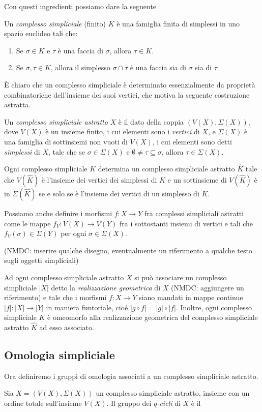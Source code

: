 Con questi ingredienti possiamo dare la seguente
\begin{defn}
Un \emph{complesso simpliciale} (finito) $K$ è una famiglia finita di simplessi in uno spazio euclideo tali che:
\begin{enumerate}
  \item Se $\sigma\in K$ e $\tau$ è una faccia di $\sigma$, allora $\tau \in K$.
  \item Se $\sigma,\tau\in K$, allora il simplesso $\sigma\cap\tau$ è una faccia sia di $\sigma$ sia di $\tau$.
\end{enumerate}
\end{defn}

\`E chiaro che un complesso simpliciale è determinato essenzialmente da proprietà combinatoriche dell'insieme dei suoi vertici, che motiva la seguente costruzione astratta.

\begin{defn}
  Un \emph{complesso simpliciale astratto} $X$ è il dato della coppia $(V(X), \Sigma(X))$, dove $V(X)$ è un insieme finito, i cui elementi sono i \emph{vertici} di $X$, e $\Sigma(X)$ è una famiglia di sottinsiemi non vuoti di $V(X)$, i cui elementi sono detti \emph{simplessi} di $X$, tale che se $\sigma \in \Sigma(X)$ e $\emptyset\neq\tau\subseteq\sigma$, allora $\tau\in\Sigma(X)$.
\end{defn}

\begin{rmk}
  Ogni complesso simpliciale $K$ determina un complesso simpliciale astratto $\widehat{K}$ tale che $V(\widehat{K})$ è l'insieme dei vertici dei simplessi di $K$ e un sottinsieme di $V(\widehat{K})$ è in $\Sigma(\widehat{K})$ se e solo se è l'insieme dei vertici di un simplesso di $K$.
\end{rmk}

Possiamo anche definire i morfismi $f:X\to Y$ fra complessi simpliciali astratti come le mappe $f_V:V(X)\to V(Y)$ fra i sottostanti insiemi di vertici e tali che $f_V(\sigma)\in \Sigma(Y)$ per ogni $\sigma \in \Sigma(X)$.

(NMDC: inserire qualche disegno, eventualmente un riferimento a qualche testo sugli oggetti simpliciali)

Ad ogni complesso simpliciale astratto $X$ si può associare un complesso simpliciale $|X|$ detto la \emph{realizzazione geometrica} di $X$ (NMDC: aggiungere un riferimento) e tale che i morfismi $f:X\to Y$ siano mandati in mappe continue $|f|:|X|\to |Y|$ in maniera funtoriale, cioé $|g\circ f|=|g|\circ |f|$. Inoltre, ogni complesso simpliciale $K$ è omeomorfo alla realizzazione geometrica del complesso simpliciale astratto $\widehat{K}$ ad esso associato.

\subsection{Omologia simpliciale}

Ora definiremo i gruppi di omologia associati a un complesso simpliciale astratto.

\begin{defn}
  Sia $X=(V(X),\Sigma(X))$ un complesso simpliciale astratto, insieme con un ordine totale sull'insieme $V(X)$. Il gruppo dei \emph{$q$-cicli} di $X$ è il 
\end{defn}
